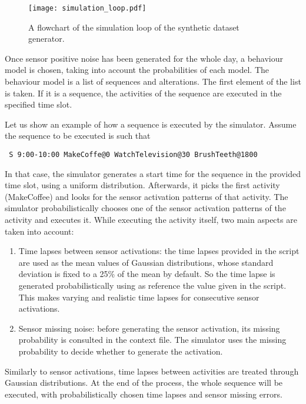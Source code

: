 \begin{figure}[htbp]
\centering
\texttt{[image: simulation\_loop.pdf]}
    \caption{A flowchart of the simulation loop of the synthetic dataset generator.}
    \label{fig-sim-loop}
\end{figure}

Once sensor positive noise has been generated for the whole day, a behaviour model is chosen, taking into account the probabilities of each model. The behaviour model is a list of sequences and alterations. The first element of the list is taken. If it is a sequence, the activities of the sequence are executed in the specified time slot. 

Let us show an example of how a sequence is executed by the simulator. Assume the sequence to be executed is such that 

\begin{small}
\begin{lstlisting}
 S 9:00-10:00 MakeCoffe@0 WatchTelevision@30 BrushTeeth@1800 
\end{lstlisting}
\end{small}

\noindent In that case, the simulator generates a start time for the sequence in the provided time slot, using a uniform distribution. Afterwards, it picks the first activity (MakeCoffee) and looks for the sensor activation patterns of that activity. The simulator probabilistically chooses one of the sensor activation patterns of the activity and executes it. While executing the activity itself, two main aspects are taken into account:

\begin{enumerate}
 \item Time lapses between sensor activations: the time lapses provided in the script are used as the mean values of Gaussian distributions, whose standard deviation is fixed to a 25\% of the mean by default. So the time lapse is generated probabilistically using as reference the value given in the script. This makes varying and realistic time lapses for consecutive sensor activations.
 \item Sensor missing noise: before generating the sensor activation, its missing probability is consulted in the context file. The simulator uses the missing probability to decide whether to generate the activation.
\end{enumerate}

Similarly to sensor activations, time lapses between activities are treated through Gaussian distributions. At the end of the process, the whole sequence will be executed, with probabilistically chosen time lapses and sensor missing errors.

